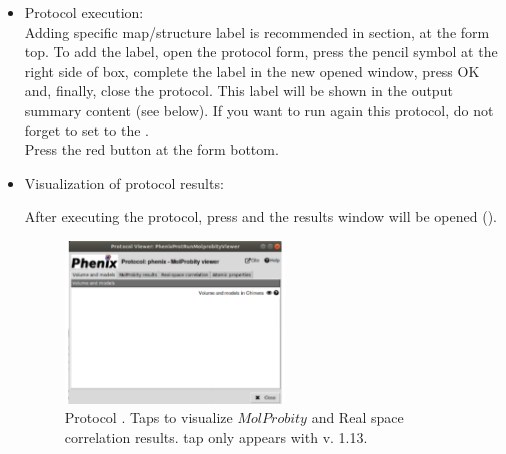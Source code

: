 \begin{itemize}
 \item Protocol execution:\\
 Adding specific map/structure label is recommended in  section, at the form top. To add the label, open the protocol form, press the pencil symbol at the right side of  box, complete the label in the new opened window, press OK and, finally, close the protocol. This label will be shown in the output summary content (see below). If you want to run again this protocol, do not forget to set to  the .\\
  Press the  red button at the form bottom.
  
 \item Visualization of protocol results:
  
  After executing the protocol, press  and the results window will be opened (). 
  
  \begin{figure}[H]
     \centering 
     \captionsetup{width=.7\linewidth} 
     \includegraphics[width=0.55\textwidth]{Images_appendix/Fig144.pdf}
     \caption{Protocol . Taps to visualize $MolProbity$  and Real space correlation results.  tap only appears with \phenix v. 1.13.}
     \label{fig:app_protocol_molprobity_2}
    \end{figure}
    

\end{itemize}
